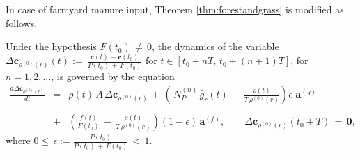 \noindent In case of farmyard manure input,  Theorem \ref{thm:forestandgrass} is modified as follows.
\begin{theorem}\label{thm:arable}
Under the hypothesis $F(t_0)\, \neq \, 0$, the dynamics of the variable 
$\Delta \mathbf{c}_{\rho^{(0)}(r)}(t):=\,  \displaystyle \frac{ \mathbf{c}(t)\, -\mathbf{c}(t_0)}{P(t_0)\,+\, F(t_0)}$ 
for  $t\in[t_0+nT,\,t_0+(n+1)T]$, for $n=1, 2, \dots$,
is governed by the equation
\begin{equation}\label{eq:change_c_arable}
  \begin{array}{rcl}
  \displaystyle \frac{d \Delta \mathbf{c}_{\rho^{(0)}(r)}}{dt}   & =& \rho(t) \, A\, \Delta \mathbf{c}_{\rho^{(0)}(r)}\, +\, \left(  \, N_P^{(n)} \, \hat g_r(t) \,-\, \displaystyle \frac{\rho(t)}{T\, \rho^{(0)}(r)}  \right) \epsilon\,  \, \mathbf{a}^{(g)} \\\\
    &+ & \left( \displaystyle \frac{f(t)}{F(t_0)}  \,-\,  \displaystyle \frac{\rho(t) }{T\, \rho^{(0)}(r)} \right) (1-\epsilon)\, \mathbf{a}^{(f)}, \qquad \Delta \mathbf{c}_{\rho^{(0)}(r)}(t_0+T)\,=\, \mathbf{0},
\end{array} 
\end{equation}
where $0\leq\,\epsilon:= \displaystyle \frac{P(t_0)}{P(t_0)\,+\,F(t_0)}\, < \, 1$. 
\end{theorem}
